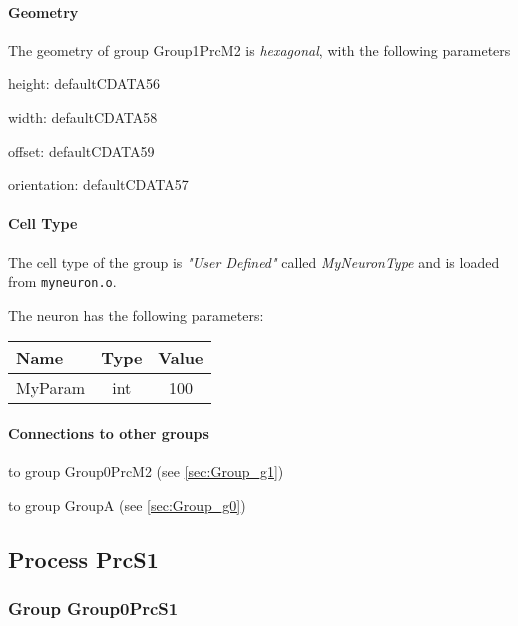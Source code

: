 \documentclass[a4paper, 11pt]{article}
\begin{document}
\paragraph*{Geometry}

The geometry of group Group1PrcM2 is \emph{hexagonal}, with
the following parameters
\begin{compactitem}
    \item height: defaultCDATA56
    \item width: defaultCDATA58
    \item offset: defaultCDATA59
    \item orientation: defaultCDATA57
\end{compactitem}

\paragraph*{Cell Type}
The cell type of the group is \emph{"User Defined"} called \emph{MyNeuronType} 
and is loaded from \verb!myneuron.o!.


The neuron has the following parameters:

\begin{center}
\begin{tabular}{l|c|c}
Name & Type & Value\\\hline
MyParam & int & 100\\
\end{tabular}
\end{center}

\paragraph*{Connections to other groups}
\begin{compactenum}
\item to group Group0PrcM2 (see \ref{sec:Group_g1})
\item to group GroupA (see \ref{sec:Group_g0})
\end{compactenum}


\subsection{Process PrcS1}


\subsubsection{Group Group0PrcS1}
\label{sec:Group_g3}
\end{document}
